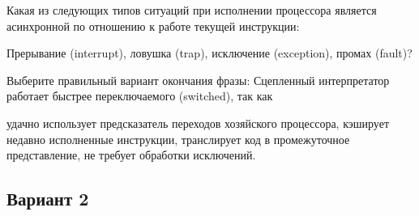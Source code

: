 \begin{questions}
\question[3] Какая из следующих типов ситуаций при исполнении процессора является асинхронной по отношению к работе текущей инструкции:
\begin{choices}
    \correctchoice Прерывание (interrupt),
    \choice ловушка (trap),
    \choice исключение (exception),
    \choice промах (fault)?
\end{choices}

\question[3] Выберите правильный вариант окончания фразы: Сцепленный интерпретатор работает быстрее переключаемого (switched), так как
\begin{choices}
    \correctchoice удачно использует предсказатель переходов хозяйского процессора,
    \choice кэширует недавно исполненные инструкции,
    \choice транслирует код в промежуточное представление,
    \choice не требует обработки исключений.
\end{choices}

\end{questions}

\subsection*{Вариант 2}

